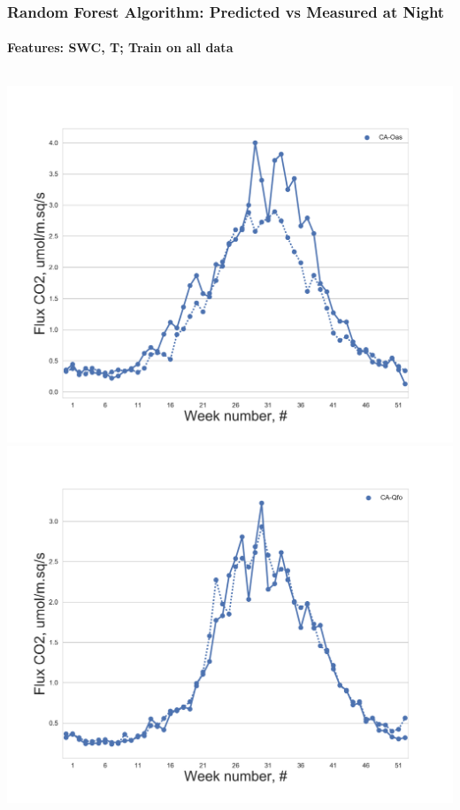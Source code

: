 \documentclass{beamer}
\begin{document}
\begin{frame}
\frametitle{Random Forest Algorithm: Predicted vs Measured at Night}
\framesubtitle{Features: SWC, T; Train on all data}

\begin{columns}[t]
\centering
\includegraphics[width=\textwidth]{F_ML_train_all/10.png}\\
\includegraphics[width=\textwidth]{F_ML_train_all/14.png}
\centering

\end{columns}
\end{frame}
\end{document}
